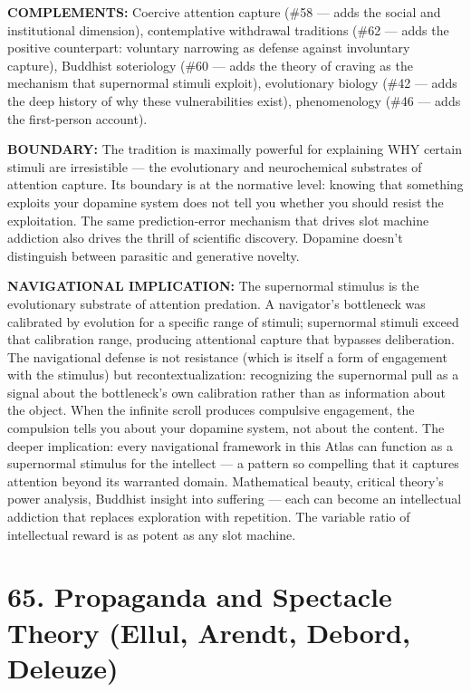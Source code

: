 \textbf{COMPLEMENTS:} Coercive attention capture (\#58 — adds the social and institutional dimension), contemplative withdrawal traditions (\#62 — adds the positive counterpart: voluntary narrowing as defense against involuntary capture), Buddhist soteriology (\#60 — adds the theory of craving as the mechanism that supernormal stimuli exploit), evolutionary biology (\#42 — adds the deep history of why these vulnerabilities exist), phenomenology (\#46 — adds the first-person account).


\textbf{BOUNDARY:} The tradition is maximally powerful for explaining WHY certain stimuli are irresistible — the evolutionary and neurochemical substrates of attention capture. Its boundary is at the normative level: knowing that something exploits your dopamine system does not tell you whether you should resist the exploitation. The same prediction-error mechanism that drives slot machine addiction also drives the thrill of scientific discovery. Dopamine doesn't distinguish between parasitic and generative novelty.


\textbf{NAVIGATIONAL IMPLICATION:} The supernormal stimulus is the evolutionary substrate of attention predation. A navigator's bottleneck was calibrated by evolution for a specific range of stimuli; supernormal stimuli exceed that calibration range, producing attentional capture that bypasses deliberation. The navigational defense is not resistance (which is itself a form of engagement with the stimulus) but recontextualization: recognizing the supernormal pull as a signal about the bottleneck's own calibration rather than as information about the object. When the infinite scroll produces compulsive engagement, the compulsion tells you about your dopamine system, not about the content. The deeper implication: every navigational framework in this Atlas can function as a supernormal stimulus for the intellect — a pattern so compelling that it captures attention beyond its warranted domain. Mathematical beauty, critical theory's power analysis, Buddhist insight into suffering — each can become an intellectual addiction that replaces exploration with repetition. The variable ratio of intellectual reward is as potent as any slot machine.


\bigskip\noindent\makebox[\textwidth]{\color{rulegray}\rule{5cm}{0.3pt}}\bigskip


\section*{65. Propaganda and Spectacle Theory (Ellul, Arendt, Debord, Deleuze)}


